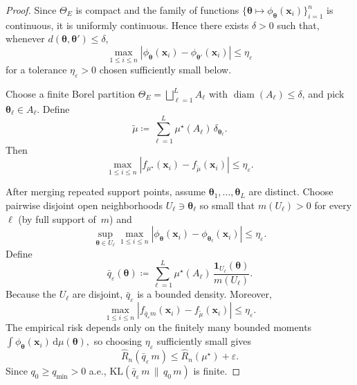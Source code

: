 \documentclass[11pt,a4paper]{article}
\theoremstyle{definition}
\theoremstyle{remark}
\newcommand{\vtheta}{\boldsymbol{\theta}}
\newcommand{\vx}{\mathbf{x}}
\newcommand{\dd}{\mathrm{d}}
\newcommand{\dmu}{\dd\mu}
\newcommand{\abs}[1]{\left|#1\right|}
\begin{document}
\begin{proof}
  Since \(\Theta_E\) is compact and the family of
  functions
  \(
    \{\vtheta \mapsto \phi_{\vtheta}(\vx_i)\}_{i=1}^n
  \)
  is continuous, it is uniformly continuous.
  Hence there exists \(\delta>0\) such that,
  whenever \(d(\vtheta,\vtheta')\le\delta\),
  \[
    \max_{1\le i\le n}
    \abs{
      \phi_{\vtheta}(\vx_i)-\phi_{\vtheta'}(\vx_i)
    }
    \le \eta_\varepsilon
  \]
  for a tolerance \(\eta_\varepsilon>0\) chosen
  sufficiently small below.

  Choose a finite Borel partition
  \(\Theta_E=\bigsqcup_{\ell=1}^L A_\ell\) with
  \(\operatorname{diam}(A_\ell)\le\delta\), and
  pick \(\vtheta_\ell \in A_\ell\). Define
  \[
    \tilde\mu
    \coloneqq
    \sum_{\ell=1}^L
    \mu^\star(A_\ell)\,\delta_{\vtheta_\ell}.
  \]
  Then
  \[
    \max_{1\le i\le n}
    \abs{
      f_{\mu^\star}(\vx_i)-f_{\tilde\mu}(\vx_i)
    }
    \le \eta_\varepsilon.
  \]

  After merging repeated support points, assume
  \(\vtheta_1,\dots,\vtheta_L\) are distinct.
  Choose pairwise disjoint open neighborhoods
  \(U_\ell \ni \vtheta_\ell\) so small that
  \(m(U_\ell)>0\) for every \(\ell\) (by full
  support of~\(m\)) and
  \[
    \sup_{\vtheta \in U_\ell}
    \max_{1\le i\le n}
    \abs{
      \phi_{\vtheta}(\vx_i)-\phi_{\vtheta_\ell}(\vx_i)
    }
    \le \eta_\varepsilon.
  \]
  Define
  \[
    \bar q_\varepsilon(\vtheta)
    \coloneqq
    \sum_{\ell=1}^L
    \mu^\star(A_\ell)\,
    \frac{\mathbf{1}_{U_\ell}(\vtheta)}{m(U_\ell)}.
  \]
  Because the \(U_\ell\) are disjoint,
  \(\bar q_\varepsilon\) is a bounded density.
  Moreover,
  \[
    \max_{1\le i\le n}
    \abs{
      f_{\bar q_\varepsilon m}(\vx_i)-f_{\tilde\mu}(\vx_i)
    }
    \le \eta_\varepsilon.
  \]
  The empirical risk depends only on the finitely
  many bounded moments
  \(
    \int \phi_{\vtheta}(\vx_i)\,\dmu(\vtheta),
  \)
  so choosing \(\eta_\varepsilon\) sufficiently
  small gives
  \[
    \hat R_n(\bar q_\varepsilon\,m)
    \le
    \hat R_n(\mu^\star) + \varepsilon.
  \]
  Since \(q_0 \ge q_{\min}>0\) a.e.,
  \(\mathrm{KL}(\bar q_\varepsilon\,m \,\|\, q_0\,m)\)
  is finite.
\end{proof}
\end{document}
